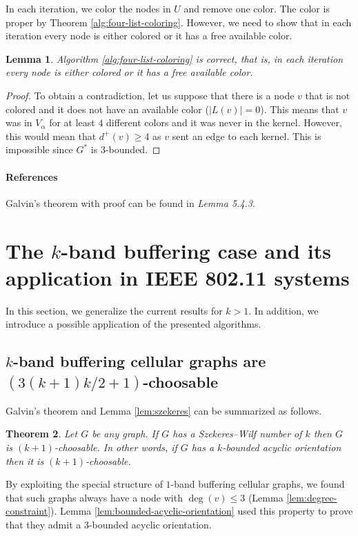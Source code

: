 \documentclass[a4paper, 12pt]{article}
\newtheorem{lem}{Lemma}[section]
\newtheorem{theo}[lem]{Theorem}
\begin{document}
In each iteration, we color the nodes in $U$ and remove one color. The color is proper by Theorem \ref{alg:four-list-coloring}. However, we need to show that in each iteration every node is either colored or it has a free available color.
\begin{lem} Algorithm \ref{alg:four-list-coloring} is correct, that is, in each iteration every node is either colored or it has a free available color.
\end{lem}
\begin{proof} To obtain a contradiction, let us suppose that there is a node $v$ that is not colored and it does not have an available color ($|L(v)|=0$). This means that $v$ was in $V_{\alpha}$ for at least $4$ different colors and it was never in the kernel. However, this would mean that $d^+(v) \geqslant 4$ as $v$ sent an edge to each kernel. This is impossible since $G^*$ is $3$-bounded.
\end{proof}

\paragraph*{References} Galvin's theorem with proof can be found in \cite{citeulike:395714} \textit{Lemma 5.4.3}.

\section{The $k$-band buffering case and its application in IEEE 802.11 systems}\label{sec:k-band-case}
In this section, we generalize the current results for $k > 1$. In addition, we introduce a possible application of the presented algorithms.

\subsection{$k$-band buffering cellular graphs are $(3(k+1)k/2+1)$-choosable}
Galvin's theorem and Lemma \ref{lem:szekeres} can be summarized as follows.
\begin{theo} Let $G$ be any graph. If $G$ has a Szekeres\---Wilf number of $k$ then $G$ is $(k+1)$-choosable. In other words, if $G$ has a $k$-bounded acyclic orientation then it is $(k+1)$-choosable.
\end{theo}

By exploiting the special structure of $1$-band buffering cellular graphs, we found that such graphs always have a node with $\deg(v) \leqslant 3$ (Lemma \ref{lem:degree-constraint}). Lemma \ref{lem:bounded-acyclic-orientation} used this property to prove that they admit a $3$-bounded acyclic orientation.
\end{document}
